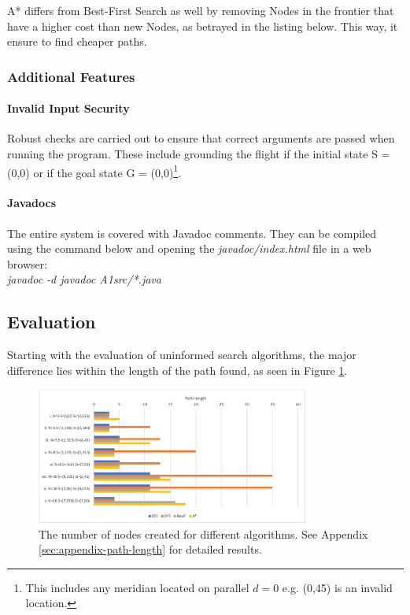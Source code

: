 \documentclass[letterpaper,12pt]{article}
\begin{document}


A* differs from Best-First Search as well by removing Nodes in the frontier that have a higher cost than new Nodes, as betrayed in the listing below. This way, it ensure to find cheaper paths.




\subsubsection{Additional Features}

\paragraph{Invalid Input Security} Robust checks are carried out to ensure that correct arguments are passed when running the program. These include grounding the flight if the initial state S = (0,0) or if the goal state G = (0,0)\footnote{This includes any meridian located on parallel $d=0$ e.g. (0,45) is an invalid location.}.

\paragraph{Javadocs} The entire system is covered with Javadoc \cite{javadoc} comments. They can be compiled using the command below and opening the \textit{javadoc/index.html} file in a web browser:\\

\textit{javadoc -d javadoc A1src/*.java}


\subsection{Evaluation}
\label{sec:evaluation}

Starting with the evaluation of uninformed search algorithms, the major difference lies within the length of the path found, as seen in Figure \ref{fig:path_length}.

\begin{figure}[ht]
\centering
\includegraphics[width=0.8\textwidth]{report/figures/path_length.png}
\caption{\label{fig:path_length}The number of nodes created for different algorithms. See Appendix \ref{sec:appendix-path-length} for detailed results.}
\end{figure}
\end{document}
